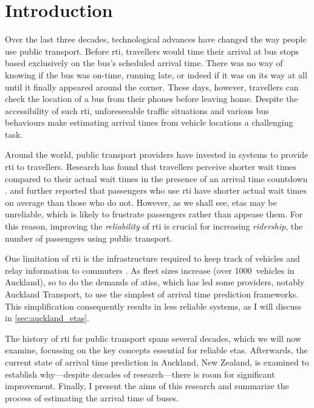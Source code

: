 \glsresetall

\chapter{Introduction}
\label{cha:intro}


Over the last three decades, technological advances have changed the way people use public transport. Before \gls{rti}, travellers would time their arrival at bus stops based exclusively on the bus's scheduled arrival time. There was no way of knowing if the bus was on-time, running late, or indeed if it was on its way at all until it finally appeared around the corner. These days, however, travellers can check the location of a bus from their phones before leaving home. Despite the accessibility of such \gls{rti}, unforeseeable traffic situations and various bus behaviours make estimating arrival times from vehicle locations a challenging task.


Around the world, public transport providers have invested in systems to provide \gls{rti} to travellers. Research has found that travellers perceive shorter wait times compared to their actual wait times in the presence of an arrival time countdown \citep{TCRP_2003}. \citet{Cats_2015} and \citet{Lu_2017} further reported that passengers who use \gls{rti} have shorter actual wait times on average than those who do not. However, as we shall see, \glspl{eta} may be unreliable, which is likely to frustrate passengers rather than appease them. For this reason, improving the \emph{reliability} of \gls{rti} is crucial for increasing \emph{ridership}, the number of passengers using public transport.


One limitation of \gls{rti} is the infrastructure required to keep track of vehicles and relay information to commuters \citep{TCRP_2003b}. As fleet sizes increase (over 1000~vehicles in Auckland), so to do the demands of \glspl{atis}, which has led some providers, notably Auckland Transport, to use the simplest of arrival time prediction frameworks. This simplification consequently results in less reliable systems, as I will discuss in \cref{sec:auckland_etas}.


The history of \gls{rti} for public transport spans several decades, which we will now examine, focussing on the key concepts essential for reliable \glspl{eta}. Afterwards, the current state of arrival time prediction in Auckland, New Zealand, is examined to establish why---despite decades of research---there is room for significant improvement. Finally, I present the aims of this research and summarize the process of estimating the arrival time of buses.




